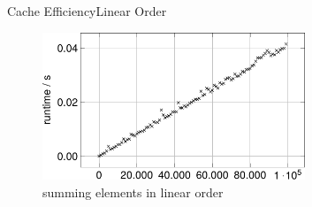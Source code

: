 %
%  
%
%
%  


\begin{frame}{Cache Efficiency}{Linear Order}
  \begin{figure}
    \begin{center}
      \includegraphics[width=0.7\textwidth]{Images/Caching/sumlinear-plot.pdf}
    \end{center}
    \caption{summing elements in linear order}
    \label{fig:caching:sum_linear_order}
  \end{figure}
\end{frame}



